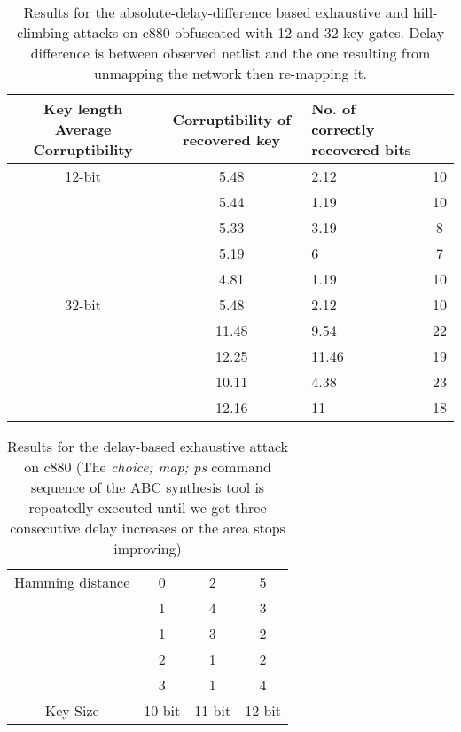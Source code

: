 \begin{table*}
\caption{Results for the absolute-delay-difference based exhaustive and hill-climbing attacks on c880 obfuscated with 12 and 32 key gates. Delay difference is between observed netlist and the one resulting from unmapping the network then re-mapping it. }
\begin{tabular}{ | c | c | p{5cm} | c | }
\hline
Key length Average Corruptibility  & Corruptibility of recovered key  & No. of correctly recovered bits \\
\hline
12-bit & 5.48 & 2.12 & 10\\

& 5.44 & 1.19 & 10\\

& 5.33 & 3.19 & 8\\

& 5.19 & 6 & 7\\

& 4.81 & 1.19 & 10\\
\hline
32-bit & 5.48 & 2.12 & 10\\

& 11.48 & 9.54 & 22\\

& 12.25 & 11.46 & 19\\

& 10.11 & 4.38 & 23\\

& 12.16 & 11 & 18\\
\hline
\end{tabular}
\end{table*}

\begin{table}
\caption{Results for the delay-based exhaustive attack on c880 (The \emph{choice; map; ps} command sequence of the ABC synthesis tool is repeatedly executed until we get three consecutive delay increases or the area stops improving)}
\begin{tabular}{ | c | c | c | c | }
\hline
Hamming distance & 0 & 2 & 5 \\
&1& 4 & 3 \\
&1& 3 & 2 \\
&2& 1 & 2 \\
&3& 1 & 4 \\
\hline
Key Size & 10-bit & 11-bit & 12-bit \\
\hline
\end{tabular}
\end{table}

